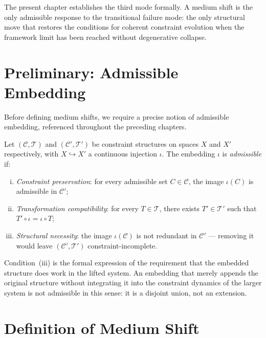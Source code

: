 \documentclass[11pt,openany]{book}
\begin{document}
The present chapter establishes the third mode formally.
A medium shift is the only admissible response to the
transitional failure mode: the only structural move that
restores the conditions for coherent constraint evolution
when the framework limit has been reached without
degenerative collapse.

\section{Preliminary: Admissible Embedding}
\label{sec:embedding}

Before defining medium shifts, we require a precise notion
of admissible embedding, referenced throughout the
preceding chapters.

\begin{definition}
\label{def:admissible-embedding}
Let $(\mathcal{C}, \mathcal{T})$ and $(\mathcal{C}',
\mathcal{T}')$ be constraint structures on spaces $X$ and
$X'$ respectively, with $X \hookrightarrow X'$ a
continuous injection $\iota$.  The embedding $\iota$ is
\emph{admissible} if:
\begin{enumerate}[(i)]
  \item \emph{Constraint preservation}: for every
    admissible set $C \in \mathcal{C}$, the image
    $\iota(C)$ is admissible in $\mathcal{C}'$;
  \item \emph{Transformation compatibility}: for every
    $T \in \mathcal{T}$, there exists $T' \in \mathcal{T}'$
    such that $T' \circ \iota = \iota \circ T$;
  \item \emph{Structural necessity}: the image
    $\iota(\mathcal{C})$ is not redundant in
    $\mathcal{C}'$ --- removing it would leave
    $(\mathcal{C}', \mathcal{T}')$ constraint-incomplete.
\end{enumerate}
\end{definition}

Condition~(iii) is the formal expression of the requirement
that the embedded structure does work in the lifted system.
An embedding that merely appends the original structure
without integrating it into the constraint dynamics of the
larger system is not admissible in this sense: it is a
disjoint union, not an extension.

\section{Definition of Medium Shift}
\label{sec:definition-medium}
\end{document}
